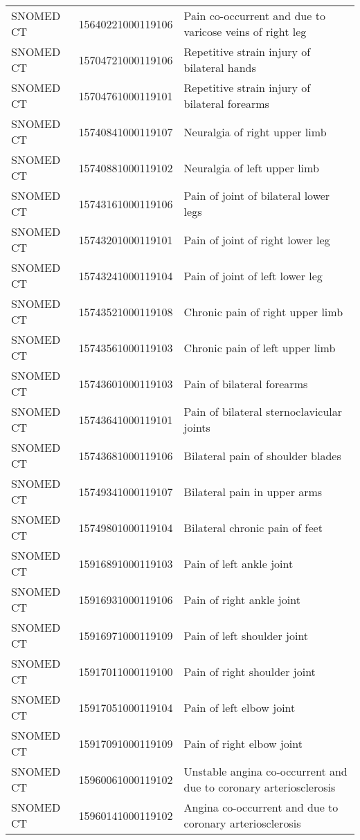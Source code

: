 \begin{longtable}{p{}p{}p{}}
  SNOMED CT & 15640221000119106 & Pain co-occurrent and due to varicose veins of right leg \\ 
  SNOMED CT & 15704721000119106 & Repetitive strain injury of bilateral hands \\ 
  SNOMED CT & 15704761000119101 & Repetitive strain injury of bilateral forearms \\ 
  SNOMED CT & 15740841000119107 & Neuralgia of right upper limb \\ 
  SNOMED CT & 15740881000119102 & Neuralgia of left upper limb \\ 
  SNOMED CT & 15743161000119106 & Pain of joint of bilateral lower legs \\ 
  SNOMED CT & 15743201000119101 & Pain of joint of right lower leg \\ 
  SNOMED CT & 15743241000119104 & Pain of joint of left lower leg \\ 
  SNOMED CT & 15743521000119108 & Chronic pain of right upper limb \\ 
  SNOMED CT & 15743561000119103 & Chronic pain of left upper limb \\ 
  SNOMED CT & 15743601000119103 & Pain of bilateral forearms \\ 
  SNOMED CT & 15743641000119101 & Pain of bilateral sternoclavicular joints \\ 
  SNOMED CT & 15743681000119106 & Bilateral pain of shoulder blades \\ 
  SNOMED CT & 15749341000119107 & Bilateral pain in upper arms \\ 
  SNOMED CT & 15749801000119104 & Bilateral chronic pain of feet \\ 
  SNOMED CT & 15916891000119103 & Pain of left ankle joint \\ 
  SNOMED CT & 15916931000119106 & Pain of right ankle joint \\ 
  SNOMED CT & 15916971000119109 & Pain of left shoulder joint \\ 
  SNOMED CT & 15917011000119100 & Pain of right shoulder joint \\ 
  SNOMED CT & 15917051000119104 & Pain of left elbow joint \\ 
  SNOMED CT & 15917091000119109 & Pain of right elbow joint \\ 
  SNOMED CT & 15960061000119102 & Unstable angina co-occurrent and due to coronary arteriosclerosis \\ 
  SNOMED CT & 15960141000119102 & Angina co-occurrent and due to coronary arteriosclerosis \\ 

\end{longtable}
